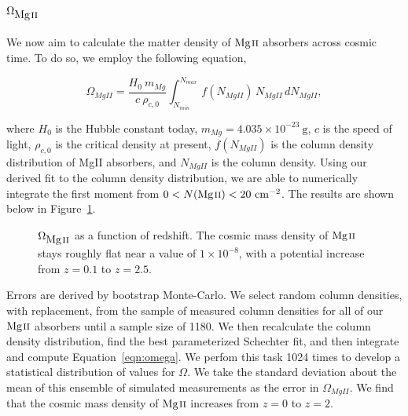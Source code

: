 \documentclass[iop,apj,numberedappendix,appendixfloats,twocolappendix]{emulateapj}
\begin{document}

\subsection{$\Omega_{\hbox{{\rm Mg}\kern 0.1em{\sc ii}}}$}
\label{omegamgii}

We now aim to calculate the matter density of ${\hbox{{\rm Mg}\kern 0.1em{\sc ii}}}$ absorbers across cosmic time. To do so, we employ the following equation,

\begin{equation}
\Omega_{MgII} = \frac{H_0\  m_{Mg}}{c\ \rho_{c,0}} \int_{N_{min}}^{N_{max}}\, f (N_{MgII})\, N_{MgII}\, dN_{MgII} ,
\label{eqn:omega}
\end{equation}

\noindent where $H_0$ is the Hubble constant today, $m_{Mg} = 4.035 \times 10^{-23}~\mathrm{g}$, $c$ is the speed of light, $\rho_{c,0}$ is the critical density at present, $f(N_{MgII})$ is the column density distribution of {MgII} absorbers, and $N_{MgII}$ is the column density. Using our derived fit to the column density distribution, we are able to numerically integrate the first moment from $0 < N({\hbox{{\rm Mg}\kern 0.1em{\sc ii}}}) < 20~\mathrm{cm^{-2}}$. The results are shown below in Figure~\ref{fig:omegamgii}. 

\begin{figure}[bth]
\caption{$\Omega_{\hbox{{\rm Mg}\kern 0.1em{\sc ii}}}$ as a function of redshift. The cosmic mass density of ${\hbox{{\rm Mg}\kern 0.1em{\sc ii}}}$ stays roughly flat near a value of $1 \times 10^{-8}$, with a potential increase from $z = 0.1$ to $z = 2.5$.}
\label{fig:omegamgii}
\end{figure}

Errors are derived by bootstrap Monte-Carlo. We select random column densities, with replacement, from the sample of measured column densities for all of our ${\hbox{{\rm Mg}\kern 0.1em{\sc ii}}}$ absorbers until a sample size of 1180. We then recalculate the column density distribution, find the best parameterized Schechter fit, and then integrate and compute Equation~\ref{eqn:omega}. We perfom this task 1024 times to develop a statistical distribution of values for $\Omega$. We take the standard deviation about the mean of this ensemble of simulated measurements as the error in $\Omega_{MgII}$. We find that the cosmic mass density of ${\hbox{{\rm Mg}\kern 0.1em{\sc ii}}}$ increases from $z = 0$ to $z = 2$. 
\end{document}
